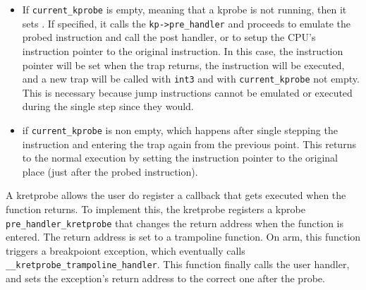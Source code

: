 \begin{itemize}

  \item If \verb|current_kprobe| is empty, meaning that a kprobe is not running,
    then it sets . If specified, it calls the
    \verb|kp->pre_handler| and proceeds to emulate the probed instruction and
    call the post handler, or to setup the CPU's instruction pointer to the
    original instruction. In this case, the instruction pointer will be set when
    the trap returns, the instruction will be executed, and a new trap will be
    called with \verb|int3| and with \verb|current_kprobe| not empty. This is
    necessary because jump instructions cannot be emulated or executed during
    the single step since they would.

  \item if \verb|current_kprobe| is non empty, which happens after single
    stepping the instruction and entering the trap again from the previous
    point. This returns to the normal execution by setting the instruction
    pointer to the original place (just after the probed instruction).

\end{itemize}

A kretprobe allows the user do register a callback that gets executed when the
function returns. To implement this, the kretprobe registers a kprobe
\verb|pre_handler_kretprobe| that changes the return address when the function
is entered. The return address is set to a trampoline function. On arm, this
function triggers a breakpoiont exception, which eventually calls
\verb|__kretprobe_trampoline_handler|. This function finally calls the user
handler, and sets the exception's return address to the correct one after the
probe.



